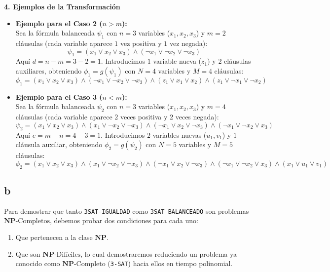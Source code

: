 \vspace{0.3cm}
\noindent\textbf{4. Ejemplos de la Transformación}

\begin{itemize}[leftmargin=*]
    \item \textbf{Ejemplo para el Caso 2 ($n > m$):}\\
    Sea la fórmula balanceada $\psi_1$ con $n = 3$ variables ($x_1, x_2, x_3$) y $m = 2$ cláusulas (cada variable aparece $1$ vez positiva y $1$ vez negada):
    \[ \psi_1 = (x_1 \lor x_2 \lor x_3) \land (\neg x_1 \lor \neg x_2 \lor \neg x_3) \]
    Aquí $d = n - m = 3 - 2 = 1$. Introducimos $1$ variable nueva ($z_1$) y $2$ cláusulas auxiliares, obteniendo $\phi_1 = g(\psi_1)$ con $N = 4$ variables y $M = 4$ cláusulas:
    \[ \phi_1 = (x_1 \lor x_2 \lor x_3) \land (\neg x_1 \lor \neg x_2 \lor \neg x_3) \land (z_1 \lor x_1 \lor x_2) \land (z_1 \lor \neg x_1 \lor \neg x_2) \]

    \item \textbf{Ejemplo para el Caso 3 ($n < m$):}\\
    Sea la fórmula balanceada $\psi_2$ con $n = 3$ variables ($x_1, x_2, x_3$) y $m = 4$ cláusulas (cada variable aparece $2$ veces positiva y $2$ veces negada):
    \[ \psi_2 = (x_1 \lor x_2 \lor x_3) \land (x_1 \lor \neg x_2 \lor \neg x_3) \land (\neg x_1 \lor x_2 \lor \neg x_3) \land (\neg x_1 \lor \neg x_2 \lor x_3) \]
    Aquí $e = m - n = 4 - 3 = 1$. Introducimos $2$ variables nuevas ($u_1, v_1$) y $1$ cláusula auxiliar, obteniendo $\phi_2 = g(\psi_2)$ con $N = 5$ variables y $M = 5$ cláusulas:
    \[ \phi_2 = (x_1 \lor x_2 \lor x_3) \land (x_1 \lor \neg x_2 \lor \neg x_3) \land (\neg x_1 \lor x_2 \lor \neg x_3) \land (\neg x_1 \lor \neg x_2 \lor x_3) \land (x_1 \lor u_1 \lor v_1) \]
\end{itemize}

\subsection{b}
Para demostrar que tanto \texttt{3SAT-IGUALDAD} como \texttt{3SAT BALANCEADO} son problemas \textbf{$\mathbf{NP}\text{-Completos}$}, debemos probar dos condiciones para cada uno:

\begin{enumerate}[label=\arabic*., leftmargin=*]
    \item Que pertenecen a la clase \textbf{$\mathbf{NP}$}.
    \item Que son \textbf{$\mathbf{NP}\text{-Difíciles}$}, lo cual demostraremos reduciendo un problema ya conocido como $\mathbf{NP}\text{-Completo}$ (\texttt{3-SAT}) hacia ellos en tiempo polinomial.
\end{enumerate}

